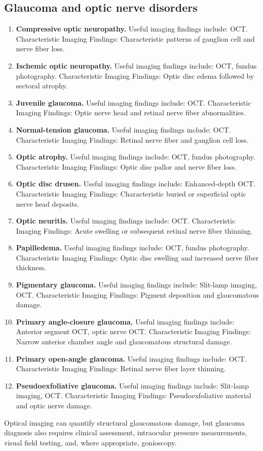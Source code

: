\subsection{Glaucoma and optic nerve disorders}
\begin{enumerate}[leftmargin=*,itemsep=0.45em,topsep=0.4em]
\item \textbf{Compressive optic neuropathy.} Useful imaging findings include: OCT. Characteristic Imaging Findings: Characteristic patterns of ganglion cell and nerve fiber loss.
\item \textbf{Ischemic optic neuropathy.} Useful imaging findings include: OCT, fundus photography. Characteristic Imaging Findings: Optic disc edema followed by sectoral atrophy.
\item \textbf{Juvenile glaucoma.} Useful imaging findings include: OCT. Characteristic Imaging Findings: Optic nerve head and retinal nerve fiber abnormalities.
\item \textbf{Normal-tension glaucoma.} Useful imaging findings include: OCT. Characteristic Imaging Findings: Retinal nerve fiber and ganglion cell loss.
\item \textbf{Optic atrophy.} Useful imaging findings include: OCT, fundus photography. Characteristic Imaging Findings: Optic disc pallor and nerve fiber loss.
\item \textbf{Optic disc drusen.} Useful imaging findings include: Enhanced-depth OCT. Characteristic Imaging Findings: Characteristic buried or superficial optic nerve head deposits.
\item \textbf{Optic neuritis.} Useful imaging findings include: OCT. Characteristic Imaging Findings: Acute swelling or subsequent retinal nerve fiber thinning.
\item \textbf{Papilledema.} Useful imaging findings include: OCT, fundus photography. Characteristic Imaging Findings: Optic disc swelling and increased nerve fiber thickness.
\item \textbf{Pigmentary glaucoma.} Useful imaging findings include: Slit-lamp imaging, OCT. Characteristic Imaging Findings: Pigment deposition and glaucomatous damage.
\item \textbf{Primary angle-closure glaucoma.} Useful imaging findings include: Anterior segment OCT, optic nerve OCT. Characteristic Imaging Findings: Narrow anterior chamber angle and glaucomatous structural damage.
\item \textbf{Primary open-angle glaucoma.} Useful imaging findings include: OCT. Characteristic Imaging Findings: Retinal nerve fiber layer thinning.
\item \textbf{Pseudoexfoliative glaucoma.} Useful imaging findings include: Slit-lamp imaging, OCT. Characteristic Imaging Findings: Pseudoexfoliative material and optic nerve damage.
\end{enumerate}
Optical imaging can quantify structural glaucomatous damage, but glaucoma diagnosis also requires clinical assessment, intraocular pressure measurements, visual field testing, and, where appropriate, gonioscopy.

